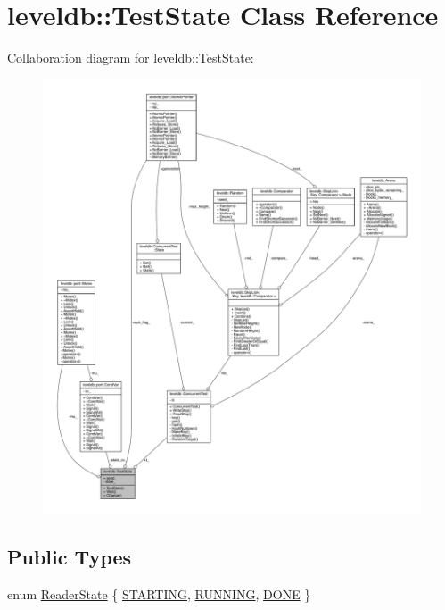 \hypertarget{classleveldb_1_1_test_state}{}\section{leveldb\+:\+:Test\+State Class Reference}
\label{classleveldb_1_1_test_state}


Collaboration diagram for leveldb\+:\+:Test\+State\+:\nopagebreak
\begin{figure}[H]
\begin{center}
\leavevmode
\includegraphics[width=350pt]{classleveldb_1_1_test_state__coll__graph}
\end{center}
\end{figure}
\subsection*{Public Types}
\begin{DoxyCompactItemize}
\item 
enum \hyperlink{classleveldb_1_1_test_state_a1bf1f0a16815237ff1f29d2925d9a4ad}{Reader\+State} \{ \hyperlink{classleveldb_1_1_test_state_a1bf1f0a16815237ff1f29d2925d9a4ada93ff507fceeb18ff487d343ce24e49fb}{S\+T\+A\+R\+T\+I\+N\+G}, 
\hyperlink{classleveldb_1_1_test_state_a1bf1f0a16815237ff1f29d2925d9a4adab21481f14b9bab70778076d33ea574da}{R\+U\+N\+N\+I\+N\+G}, 
\hyperlink{classleveldb_1_1_test_state_a1bf1f0a16815237ff1f29d2925d9a4ada5d7f032453f326a46f7ebd8b3f0c7d83}{D\+O\+N\+E}
 \}
\end{DoxyCompactItemize}
